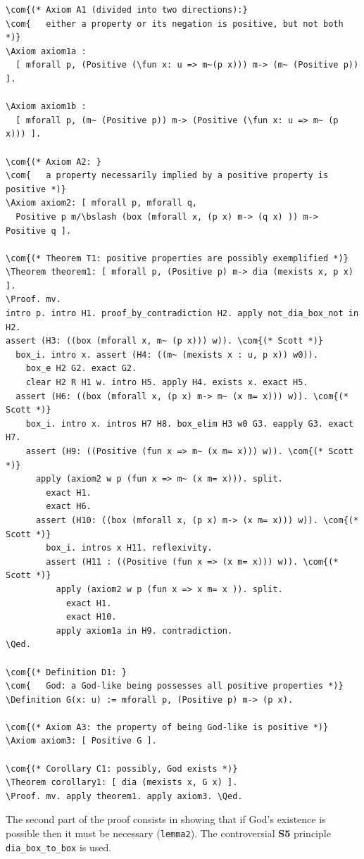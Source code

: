 \documentclass{llncs}
\newcommand{\red}[1]{\textcolor[rgb]{1,0,0}{#1}}
\newcommand{\blue}[1]{\textcolor[rgb]{0,0,1}{#1}}
\newcommand{\brown}[1]{\textcolor[rgb]{0.8,0.6,0.4}{#1}}
\newcommand{\Axiom}{\red{Axiom}}
\newcommand{\Theorem}{\red{Theorem}}
\newcommand{\Definition}{\red{Definition}}
\newcommand{\fun}{\blue{fun}}
\newcommand{\Proof}{\blue{Proof}}
\newcommand{\Qed}{\blue{Qed}}
\newcommand{\com}[1]{\brown{#1}}
\newcommand{\bslash}{\symbol{92}}
\begin{document}
\begin{Verbatim}[commandchars=\\\{\},fontsize=\verbsize]
\com{(* Axiom A1 (divided into two directions):} 
\com{   either a property or its negation is positive, but not both *)}
\Axiom axiom1a : 
  [ mforall p, (Positive (\fun x: u => m~(p x))) m-> (m~ (Positive p)) ].

\Axiom axiom1b : 
  [ mforall p, (m~ (Positive p)) m-> (Positive (\fun x: u => m~ (p x))) ].

\com{(* Axiom A2: }
\com{   a property necessarily implied by a positive property is positive *)}
\Axiom axiom2: [ mforall p, mforall q, 
  Positive p m/\bslash (box (mforall x, (p x) m-> (q x) )) m-> Positive q ].

\com{(* Theorem T1: positive properties are possibly exemplified *)}
\Theorem theorem1: [ mforall p, (Positive p) m-> dia (mexists x, p x) ].
\Proof. mv.
intro p. intro H1. proof_by_contradiction H2. apply not_dia_box_not in H2.
assert (H3: ((box (mforall x, m~ (p x))) w)). \com{(* Scott *)}
  box_i. intro x. assert (H4: ((m~ (mexists x : u, p x)) w0)).
    box_e H2 G2. exact G2.
    clear H2 R H1 w. intro H5. apply H4. exists x. exact H5.
  assert (H6: ((box (mforall x, (p x) m-> m~ (x m= x))) w)). \com{(* Scott *)}   
    box_i. intro x. intros H7 H8. box_elim H3 w0 G3. eapply G3. exact H7.
    assert (H9: ((Positive (fun x => m~ (x m= x))) w)). \com{(* Scott *)}
      apply (axiom2 w p (fun x => m~ (x m= x))). split.
        exact H1.
        exact H6.
      assert (H10: ((box (mforall x, (p x) m-> (x m= x))) w)). \com{(* Scott *)}
        box_i. intros x H11. reflexivity.
        assert (H11 : ((Positive (fun x => (x m= x))) w)). \com{(* Scott *)}
          apply (axiom2 w p (fun x => x m= x )). split.
            exact H1.
            exact H10.
          apply axiom1a in H9. contradiction.
\Qed.

\com{(* Definition D1: }
\com{   God: a God-like being possesses all positive properties *)}
\Definition G(x: u) := mforall p, (Positive p) m-> (p x).

\com{(* Axiom A3: the property of being God-like is positive *)}
\Axiom axiom3: [ Positive G ].

\com{(* Corollary C1: possibly, God exists *)}
\Theorem corollary1: [ dia (mexists x, G x) ]. 
\Proof. mv. apply theorem1. apply axiom3. \Qed.
\end{Verbatim}

\noindent 
The second part of the proof consists in showing that if
God's existence is possible then it must be necessary
(\texttt{lemma2}). The controversial \textbf{S5} principle
\texttt{dia\_box\_to\_box} is used.
\end{document}
